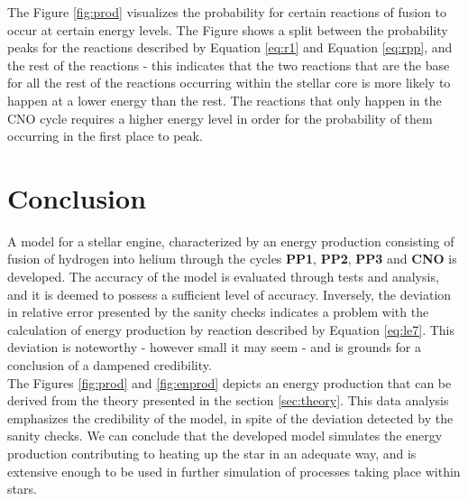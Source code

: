 \documentclass[10pt, nofootinbib, twocolumn]{revtex4-1}
\begin{document}
The Figure \ref{fig:prod} visualizes the probability for certain reactions of fusion to occur at certain energy levels. The Figure shows a split between the probability peaks for the reactions described by Equation \eqref{eq:r1} and Equation \eqref{eq:rpp}, and the rest of the reactions - this indicates that the two reactions that are the base for all the rest of the reactions occurring within the stellar core is more likely to happen at a lower energy than the rest. The reactions that only happen in the CNO cycle requires a higher energy level in order for the probability of them occurring in the first place to peak.


\section{Conclusion}\label{sec:conclusion}
A model for a stellar engine, characterized by an energy production consisting of fusion of hydrogen into helium through the cycles \textbf{PP1}, \textbf{PP2}, \textbf{PP3} and \textbf{CNO} is developed. The accuracy of the model is evaluated through tests and analysis, and it is deemed to possess a sufficient level of accuracy. Inversely, the deviation in relative error presented by the sanity checks indicates a problem with the calculation of energy production by reaction described by Equation \eqref{eq:le7}. This deviation is noteworthy - however small it may seem - and is grounds for a conclusion of a dampened credibility. \\

The Figures \ref{fig:prod} and \ref{fig:enprod} depicts an energy production that can be derived from the theory presented in the section \ref{sec:theory}. This data analysis emphasizes the credibility of the model, in spite of the deviation detected by the sanity checks. We can conclude that the developed model simulates the energy production contributing to heating up the star in an adequate way, and is extensive enough to be used in further simulation of processes taking place within stars. \\
\end{document}
